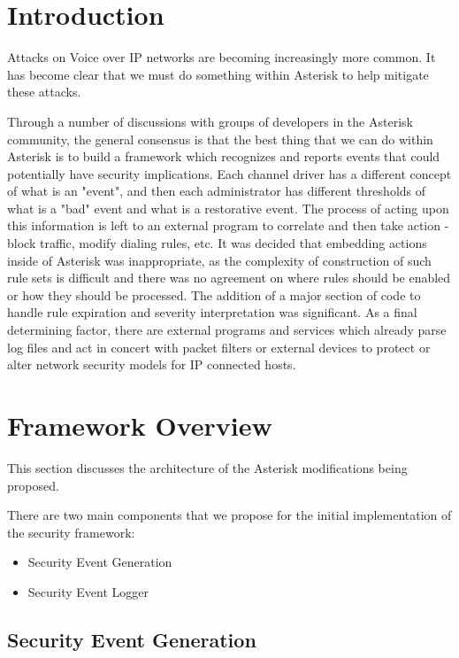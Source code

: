\section{Introduction}

   Attacks on Voice over IP networks are becoming increasingly more common.  It
has become clear that we must do something within Asterisk to help mitigate
these attacks.

   Through a number of discussions with groups of developers in the Asterisk
community, the general consensus is that the best thing that we can do within
Asterisk is to build a framework which recognizes and reports events that could
potentially have security implications.  Each channel driver has a different
concept of what is an "event", and then each administrator has different
thresholds of what is a "bad" event and what is a restorative event.  The
process of acting upon this information is left to an external program to
correlate and then take action - block traffic, modify dialing rules, etc.  It
was decided that embedding actions inside of Asterisk was inappropriate, as the
complexity of construction of such rule sets is difficult and there was no
agreement on where rules should be enabled or how they should be processed.  The
addition of a major section of code to handle rule expiration and severity
interpretation was significant.  As a final determining factor, there are
external programs and services which already parse log files and act in concert
with packet filters or external devices to protect or alter network security
models for IP connected hosts.

\section{Framework Overview}

    This section discusses the architecture of the Asterisk modifications being
proposed.

    There are two main components that we propose for the initial
implementation of the security framework:

\begin{itemize}
    \item Security Event Generation
    \item Security Event Logger
\end{itemize}

\subsection{Security Event Generation}

